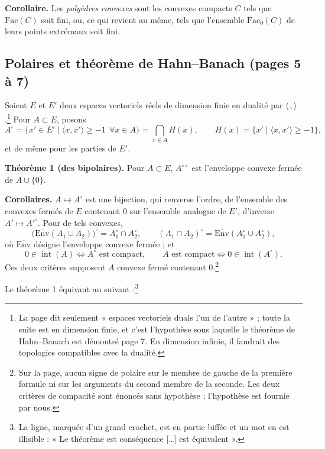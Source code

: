 \documentclass[11pt,a4paper]{article}
\begin{document}
\textbf{Corollaire.} Les \emph{polyèdres convexes} sont les convexes compacts
$C$ tels que $\mathrm{Fac}(C)$ soit fini, ou, ce qui revient au même, tels que
l'ensemble $\mathrm{Fac}_{0}(C)$ de leurs points extrémaux soit fini.

\subsection*{Polaires et théorème de Hahn--Banach (pages 5 à 7)}

Soient $E$ et $E'$ deux espaces vectoriels réels de dimension finie en dualité
par $\langle\, ,\rangle$.\footnote{La page dit seulement « espaces vectoriels
duals l'un de l'autre » ; toute la suite est en dimension finie, et c'est
l'hypothèse sous laquelle le théorème de Hahn--Banach est démontré page 7. En
dimension infinie, il faudrait des topologies compatibles avec la dualité.}
Pour $A \subset E$, posons
\[
  A^{\circ} = \{x' \in E' \mid \langle x, x' \rangle \geq -1 \ \ \forall x \in A\}
  = \bigcap_{x \in A} H(x), \qquad
  H(x) = \{x' \mid \langle x, x' \rangle \geq -1\},
\]
et de même pour les parties de $E'$.

\textbf{Théorème 1 (des bipolaires).} Pour $A \subset E$, $A^{\circ\circ}$ est
l'enveloppe convexe fermée de $A \cup \{0\}$.

\textbf{Corollaires.} $A \mapsto A^{\circ}$ est une bijection, qui renverse
l'ordre, de l'ensemble des convexes fermés de $E$ contenant $0$ sur l'ensemble
analogue de $E'$, d'inverse $A' \mapsto A'^{\circ}$. Pour de tels convexes,
\[
  \bigl(\overline{\mathrm{Env}}(A_{1} \cup A_{2})\bigr)^{\circ} = A_{1}^{\circ}
  \cap A_{2}^{\circ}, \qquad
  (A_{1} \cap A_{2})^{\circ} = \overline{\mathrm{Env}}(A_{1}^{\circ} \cup
  A_{2}^{\circ}),
\]
où $\overline{\mathrm{Env}}$ désigne l'enveloppe convexe fermée ; et
\[
  0 \in \operatorname{int}(A) \iff A^{\circ} \text{ est compact}, \qquad
  A \text{ est compact} \iff 0 \in \operatorname{int}(A^{\circ}).
\]
Ces deux critères supposent $A$ convexe fermé contenant $0$.\footnote{Sur la page, aucun signe de polaire sur le membre de gauche de la
première formule ni sur les arguments du second membre de la seconde. Les
deux critères de compacité sont énoncés sans hypothèse ; l'hypothèse est
fournie par nous.}

Le théorème 1 équivaut au suivant :\footnote{La ligne, marquée d'un grand
crochet, est en partie biffée et un mot en est illisible : « Le théorème est
conséquence [\ldots] est équivalent ».}
\end{document}
